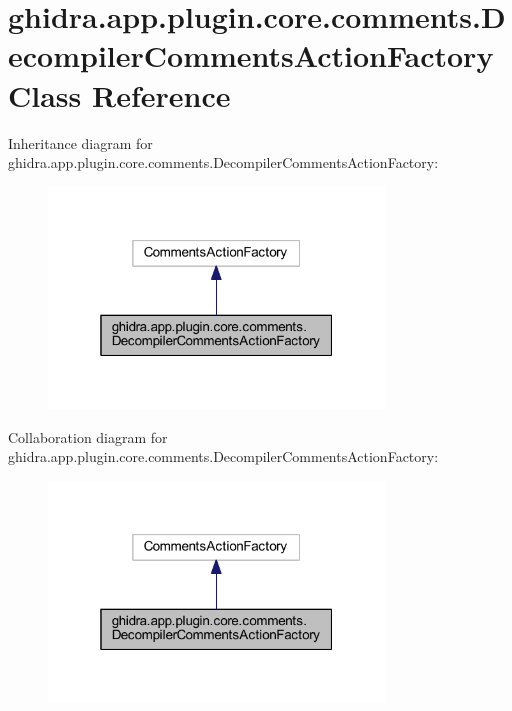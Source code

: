 \hypertarget{classghidra_1_1app_1_1plugin_1_1core_1_1comments_1_1_decompiler_comments_action_factory}{}\section{ghidra.\+app.\+plugin.\+core.\+comments.\+Decompiler\+Comments\+Action\+Factory Class Reference}
\label{classghidra_1_1app_1_1plugin_1_1core_1_1comments_1_1_decompiler_comments_action_factory}


Inheritance diagram for ghidra.\+app.\+plugin.\+core.\+comments.\+Decompiler\+Comments\+Action\+Factory\+:
\nopagebreak
\begin{figure}[H]
\begin{center}
\leavevmode
\includegraphics[width=253pt]{classghidra_1_1app_1_1plugin_1_1core_1_1comments_1_1_decompiler_comments_action_factory__inherit__graph}
\end{center}
\end{figure}


Collaboration diagram for ghidra.\+app.\+plugin.\+core.\+comments.\+Decompiler\+Comments\+Action\+Factory\+:
\nopagebreak
\begin{figure}[H]
\begin{center}
\leavevmode
\includegraphics[width=253pt]{classghidra_1_1app_1_1plugin_1_1core_1_1comments_1_1_decompiler_comments_action_factory__coll__graph}
\end{center}
\end{figure}
